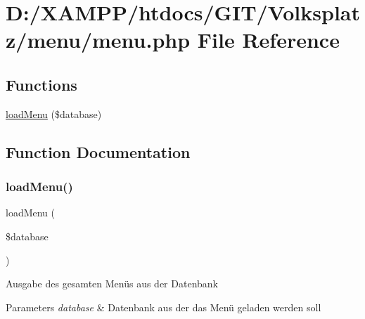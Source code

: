 \hypertarget{menu_8php}{}\section{D\+:/\+X\+A\+M\+P\+P/htdocs/\+G\+I\+T/\+Volksplatz/menu/menu.php File Reference}
\label{menu_8php}
\subsection*{Functions}
\begin{DoxyCompactItemize}
\item 
\mbox{\hyperlink{menu_8php_a04d512ba1dad1117a56cb6d6d62def92}{load\+Menu}} (\$database)
\end{DoxyCompactItemize}


\subsection{Function Documentation}
\mbox{\label{menu_8php_a04d512ba1dad1117a56cb6d6d62def92}} 
\subsubsection{\texorpdfstring{loadMenu()}{loadMenu()}}
{\footnotesize\ttfamily load\+Menu (\begin{DoxyParamCaption}\item[{}]{\$database }\end{DoxyParamCaption})}

Ausgabe des gesamten Menüs aus der Datenbank 
\begin{DoxyParams}{Parameters}
{\em database} & Datenbank aus der das Menü geladen werden soll \\
\hline
\end{DoxyParams}
